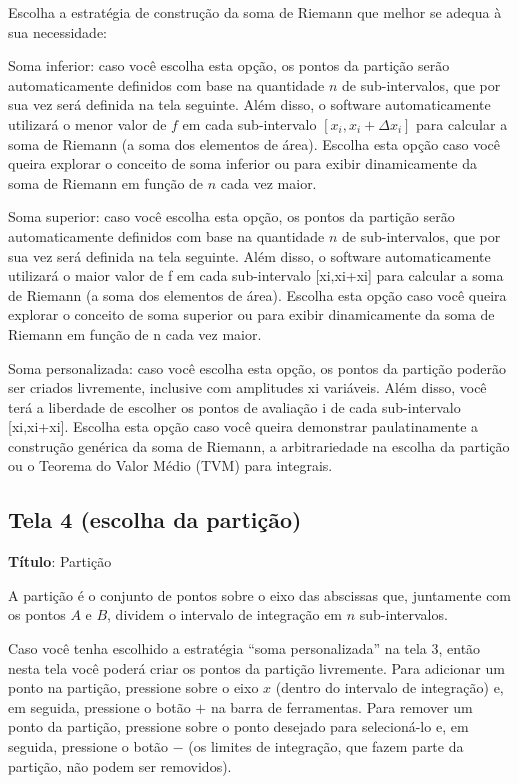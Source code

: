 \documentclass[a4paper,10pt]{scrartcl}
\begin{document}
    Escolha a estratégia de construção da soma de Riemann que melhor se adequa à sua necessidade:
    \begin{compactdesc}
    \item{Soma inferior:} caso você escolha esta opção, os pontos da partição serão automaticamente definidos
    com base na quantidade $n$ de sub-intervalos, que por sua vez será definida na tela seguinte.
    Além disso, o software automaticamente utilizará o menor valor de $f$ em cada sub-intervalo $[x_i,x_i+\Delta x_i]$ para calcular a soma de Riemann
    (a soma dos elementos de área). Escolha esta opção caso você queira explorar o conceito de soma inferior ou para exibir dinamicamente da soma de Riemann
    em função de $n$ cada vez maior.    
    \item{Soma superior:} caso você escolha esta opção, os pontos da partição serão automaticamente definidos com base na quantidade $n$ de sub-intervalos, que por sua vez será definida na tela seguinte. Além disso, o software automaticamente utilizará o maior valor de f em cada sub-intervalo [xi,xi+xi] para calcular a soma de Riemann (a soma dos elementos de área). Escolha esta opção caso você queira explorar o conceito de soma superior ou para exibir dinamicamente da soma de Riemann em função de n cada vez maior.    
    \item{Soma personalizada:} caso você escolha esta opção, os pontos da partição poderão ser criados livremente, inclusive com amplitudes xi variáveis. Além disso, você terá a liberdade de escolher os pontos de avaliação i de cada sub-intervalo [xi,xi+xi]. Escolha esta opção caso você queira demonstrar paulatinamente a construção genérica da soma de Riemann, a arbitrariedade na escolha da partição ou o Teorema do Valor Médio (TVM) para integrais.
    \end{compactdesc}

  \subsection*{Tela 4 (escolha da partição)}
    \textbf{Título}: Partição
    
    A partição é o conjunto de pontos sobre o eixo das abscissas que, juntamente com os pontos $A$ e $B$, dividem o intervalo de integração em $n$ sub-intervalos.
    
    Caso você tenha escolhido a estratégia ``soma personalizada'' na tela 3, então nesta tela você poderá criar os pontos da partição livremente. Para adicionar um ponto na partição, pressione sobre o eixo $x$ (dentro do intervalo de integração) e, em seguida, pressione o botão $+$ na barra de ferramentas. Para remover um ponto da partição, pressione sobre o ponto desejado para selecioná-lo e, em seguida, pressione o botão $-$ (os limites de integração, que fazem parte da partição, não podem ser removidos).
    
\end{document}
